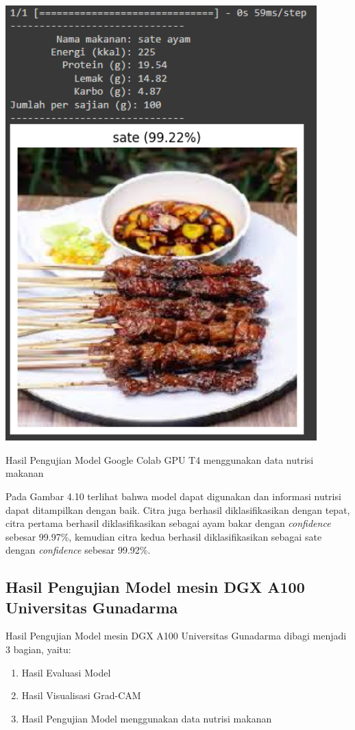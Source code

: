 \begin{afigure}
    \includegraphics[height=0.55\textheight, width=0.9\textwidth, center]{images/predict-2.png}
    \caption{Hasil Pengujian Model Google Colab GPU T4 menggunakan data nutrisi makanan}
    \label{fig:predict-2}
\end{afigure}

Pada Gambar 4.10 terlihat bahwa model dapat digunakan dan informasi nutrisi dapat ditampilkan dengan baik. Citra juga berhasil diklasifikasikan dengan tepat, citra pertama berhasil diklasifikasikan sebagai ayam bakar dengan \textit{confidence} sebesar 99.97\%, kemudian citra kedua berhasil diklasifikasikan sebagai sate dengan \textit{confidence} sebesar 99.92\%.

\subsection{Hasil Pengujian Model mesin DGX A100 Universitas Gunadarma}
Hasil Pengujian Model mesin DGX A100 Universitas Gunadarma dibagi menjadi 3 bagian, yaitu:
\begin{enumerate}
    \item Hasil Evaluasi Model
    \item Hasil Visualisasi Grad-CAM
    \item Hasil Pengujian Model menggunakan data nutrisi makanan
\end{enumerate}

